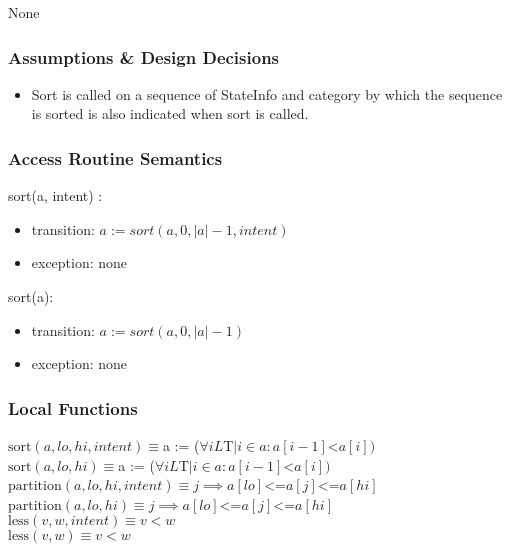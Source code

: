 \documentclass[12pt]{article}
\begin{document}
None

\subsubsection* {Assumptions \& Design Decisions}

\begin{itemize}
\item Sort is called on a sequence of StateInfo and category by which the sequence is sorted is also indicated when sort is called.
\end{itemize}

\subsubsection* {Access Routine Semantics}

\noindent sort(a, intent) :
\begin{itemize}
\item transition: $a := sort(a, 0, |a| - 1, intent)$
\item exception: none
\end{itemize}

\noindent sort(a):
\begin{itemize}
\item transition: $a := sort(a, 0, |a| - 1)$
\item exception: none
\end{itemize}

\subsubsection* {Local Functions}

\noindent
$\text{sort}(a, lo, hi, intent) \equiv $a := ($\forall i L $T$ | i \in a : a[i - 1]  $<$ a[i])  $ \\


\noindent
$\text{sort}(a, lo, hi) \equiv $a := ($\forall i L $T$ | i \in a : a[i - 1]  $<$ a[i])  $ \\

\noindent
$\text{partition}(a, lo, hi, intent) \equiv j \implies a[lo] $<=$ a[j] $<=$ a[hi]$ \\

\noindent
$\text{partition}(a, lo, hi) \equiv j \implies a[lo] $<=$ a[j] $<=$ a[hi]$ \\

\noindent
$\text{less}(v,  w, intent) \equiv v < w$ \\
\noindent
$\text{less}(v,  w) \equiv v < w$ \\
\end{document}
